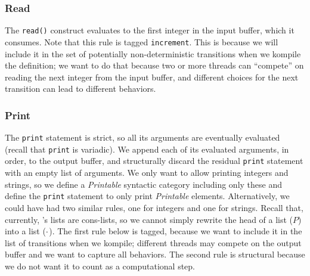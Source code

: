 \documentclass{article}
\begin{document}
\begin{kdefinition}
\begin{module}{}
\begin{kblock}[text]
 \subsubsection{Read}
The \texttt{read()} construct evaluates to the first integer in the
input buffer, which it consumes.  Note that this rule is tagged
\texttt{increment}.  This is because we will include it in the set of
potentially non-deterministic transitions when we kompile the definition;
we want to do that because two or more threads can ``compete'' on
reading the next integer from the input buffer, and different choices
for the next transition can lead to different behaviors. \end{kblock}
\begin{kblock}[text]
 \subsubsection{Print}
The \texttt{print} statement is strict, so all its arguments are
eventually evaluated (recall that \texttt{print} is variadic).  We
append each of its evaluated arguments, in order, to the output buffer,
and structurally discard the residual \texttt{print} statement with an
empty list of arguments.  We only want to allow printing integers and
strings, so we define a {\em Printable} syntactic category including
only these and define the \texttt{print} statement to only print
{\em Printable} elements.  Alternatively, we could have had two
similar rules, one for integers and one for strings.  Recall that,
currently, \K's lists are cons-lists, so we cannot simply rewrite the
head of a list ($P$) into a list ($\cdot$).  The first rule below is tagged,
because we want to include it in the list of transitions when we kompile;
different threads may compete on the output buffer and we want to capture
all behaviors.  The second rule is structural because we do not want it to
count as a computational step. \end{kblock}

\begin{syntaxBlock}{}
\end{syntaxBlock}
\begin{kblock}[text]

\end{kblock}
\end{module}
\end{kdefinition}
\end{document}
